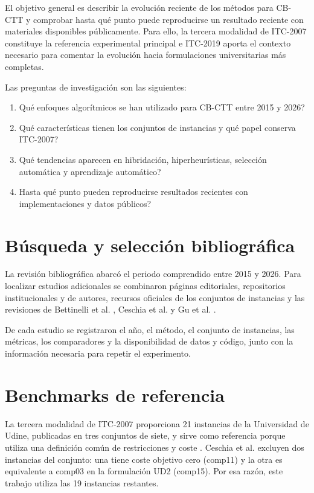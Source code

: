 \documentclass[journal]{IEEEtran}
\begin{document}
El objetivo general es describir la evolución reciente de los métodos para CB-CTT y comprobar hasta qué punto puede reproducirse un resultado reciente con materiales disponibles públicamente. Para ello, la tercera modalidad de ITC-2007 constituye la referencia experimental principal e ITC-2019 aporta el contexto necesario para comentar la evolución hacia formulaciones universitarias más completas.


Las preguntas de investigación son las siguientes:
\begin{enumerate}
\item \textquestiondown Qué enfoques algorítmicos se han utilizado para CB-CTT entre 2015 y 2026?
\item \textquestiondown Qué características tienen los conjuntos de instancias y qué papel conserva ITC-2007?
\item \textquestiondown Qué tendencias aparecen en hibridación, hiperheurísticas, selección automática y aprendizaje automático?
\item \textquestiondown Hasta qué punto pueden reproducirse resultados recientes con implementaciones y datos públicos?
\end{enumerate}


\section{Búsqueda y selección bibliográfica}

La revisión bibliográfica abarcó el periodo comprendido entre 2015 y 2026. Para localizar estudios adicionales se combinaron páginas editoriales, repositorios institucionales y de autores, recursos oficiales de los conjuntos de instancias y las revisiones de Bettinelli et al. \cite{ref3}, Ceschia et al. \cite{ref2} y Gu et al. \cite{ref4}.


De cada estudio se registraron el año, el método, el conjunto de instancias, las métricas, los comparadores y la disponibilidad de datos y código, junto con la información necesaria para repetir el experimento.


\section{Benchmarks de referencia}

La tercera modalidad de ITC-2007 proporciona 21 instancias de la Universidad de Udine, publicadas en tres conjuntos de siete, y sirve como referencia porque utiliza una definición común de restricciones y coste \cite{ref1}. Ceschia et al. \cite{ref2} excluyen dos instancias del conjunto: una tiene coste objetivo cero (comp11) y la otra es equivalente a comp03 en la formulación UD2 (comp15). Por esa razón, este trabajo utiliza las 19 instancias restantes.
\end{document}
